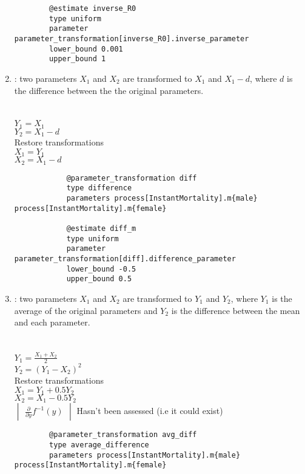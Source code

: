 \begin{enumerate}
{{\begin{verbatim}
		@estimate inverse_R0
		type uniform
		parameter parameter_transformation[inverse_R0].inverse_parameter
		lower_bound 0.001
		upper_bound 1
		\end{verbatim}}}
	
\item {} : two parameters $X_1$ and $X_2$ are transformed to $X_1$ and $X_1 - d$, where $d$ is the difference between the the original parameters.\\
\\
\\
$Y_1 = X_1$\\
$Y_2 = X_1 - d$\\
Restore transformations\\
$X_1 = Y_1$\\
$X_2 = X_1 - d$\\
\label{sec:Transformation-Difference}
{\small{\begin{verbatim}
			@parameter_transformation diff
			type difference
			parameters process[InstantMortality].m{male} process[InstantMortality].m{female}
			
			@estimate diff_m
			type uniform
			parameter parameter_transformation[diff].difference_parameter
			lower_bound -0.5
			upper_bound 0.5		
\end{verbatim}}}

\item {} : two parameters $X_1$ and $X_2$ are transformed to $Y_1$ and $Y_2$, where $Y_1$ is the average of the original parameters and $Y_2$ is the difference between the mean and each parameter.\\
\\
\\
$Y_1 = \frac{X_1 + X_2}{2}$\\
$Y_2 =  (Y_1 - X_2)^2 $\\
Restore transformations\\
$X_1 = Y_1 + 0.5Y_2$\\
$X_2 = X_1 - 0.5Y_2$\\
$\begin{vmatrix} \frac{\partial}{\partial y} f^{-1}(y) \end{vmatrix}$ Hasn't been assessed (i.e it could exist) \label{sec:Transformation-AverageDifference}
{\small{\begin{verbatim}
		@parameter_transformation avg_diff
		type average_difference
		parameters process[InstantMortality].m{male} process[InstantMortality].m{female}
		

\end{verbatim}}}
\end{enumerate}
